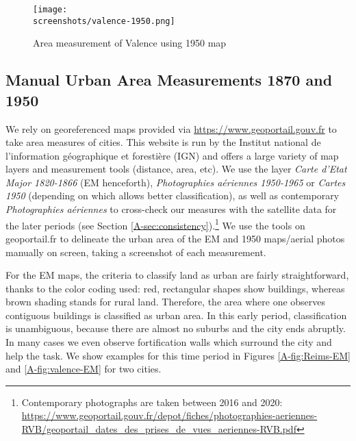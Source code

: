 \documentclass[11pt]{report}
\newcommand{\screenshots}{../../data/present-screenshots}
\begin{document}
\begin{figure}[p]
	\centering
	\texttt{[image: \\screenshots/valence-1950.png]}
	\caption{Area measurement of Valence using 1950 map\label{A-fig:valence-1950}}
\end{figure}

\subsection{Manual Urban Area Measurements 1870 and 1950}\label{A-subsec:manual-area}

We rely on georeferenced maps provided via \url{https://www.geoportail.gouv.fr} to take area measures of cities. This website is run by the Institut national de l’information géographique et forestière (IGN) and offers a large variety of map layers and measurement tools (distance, area, etc). We use the layer \emph{Carte d'Etat Major 1820-1866} (EM henceforth), \emph{Photographies aériennes 1950-1965} or \emph{Cartes 1950} (depending on which allows better classification), as well as contemporary \emph{Photographies aériennes} to cross-check our measures with the satellite data for the later periods (see Section \ref{A-sec:consistency}).\footnote{Contemporary photographs are taken between 2016 and 2020: \url{https://www.geoportail.gouv.fr/depot/fiches/photographies-aeriennes-RVB/geoportail_dates_des_prises_de_vues_aeriennes-RVB.pdf}} We use the tools on geoportail.fr to delineate the urban area of the EM and 1950 maps/aerial photos manually on screen, taking a screenshot of each measurement. 

For the EM maps, the criteria to classify land as urban are fairly straightforward, thanks to the color coding used: red, rectangular shapes show buildings, whereas brown shading stands for rural land. Therefore, the area where one observes contiguous buildings is classified as urban area. In this early period, classification is unambiguous, because there are almost no suburbs and the city ends abruptly. In many cases we even observe fortification walls which surround the city and help the task. We show examples for this time period in Figures \ref{A-fig:Reims-EM} and \ref{A-fig:valence-EM} for two cities.
\end{document}

